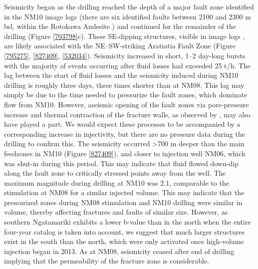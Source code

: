 Seismicity began as the drilling reached the depth of a major fault zone identified in the NM10 image logs (there are six identified faults between 2100 and 2300 m bsl, within the Rotokawa Andesite \cite{nm10_report}) and continued for the remainder of the drilling (Figure \ref{703798}c). These SE-dipping structures, visible in image logs \citep{nm10_report}, are likely associated with the NE--SW-striking Aratiatia Fault Zone (Figure \ref{795275}, \ref{827409}, \ref{532034}). Seismicity increased in short, 1--2 day-long bursts with the majority of events occurring after fluid losses had exceeded 25 t/h. The lag between the start of fluid losses and the seismicity induced during NM10 drilling is roughly three days, three times shorter than at NM08. This lag may simply be due to the time needed to pressurize the fault zones, which dominate flow from NM10. However, aseismic opening of the fault zones via pore-pressure increase and thermal contraction of the fracture walls, as observed by \citet{Guglielmi_2015}, may also have played a part. We would expect these processes to be accompanied by a corresponding increase in injectivity, but there are no pressure data during the drilling to confirm this. The seismicity occurred \textgreater700 m deeper than the main feedzones in NM10 (Figure \ref{827409}), and closer to injection well NM06, which was shut-in during this period. This may indicate that fluid flowed down-dip along the fault zone to critically stressed points away from the well. The maximum magnitude during drilling at NM10 was 2.1, comparable to the stimulation at NM08 for a similar injected volume. This may indicate that the pressurized zones during NM08 stimulation and NM10 drilling were similar in volume, thereby affecting fractures and faults of similar size. However, as southern Ngatamariki exhibits a lower b-value than in the north when the entire four-year catalog is taken into account, we suggest that much larger structures exist in the south than the north, which were only activated once high-volume injection began in 2013. As at NM08, seismicity ceased after end of drilling implying that the permeability of the fracture zone is considerable.

